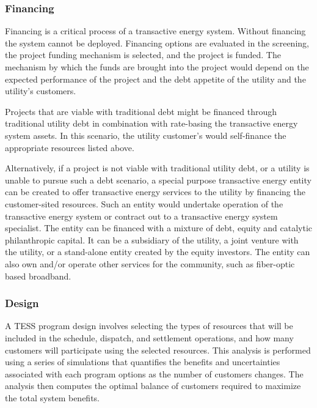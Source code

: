 \documentclass[10pt,twocolumn]{article}
\begin{document}
\subsubsection{Financing}

Financing is a critical process of a transactive energy system. Without financing the system cannot be deployed.  Financing options are evaluated in the screening, the project funding mechanism is selected, and the project is funded.  The mechanism by which the funds are brought into the project would depend on the expected performance of the project and the debt appetite of the utility and the utility's customers.  

Projects that are viable with traditional debt might be financed through traditional utility debt in combination with rate-basing the transactive energy system assets.  In this scenario, the utility customer's would self-finance the appropriate resources listed above.  

Alternatively, if a project is not viable with traditional utility debt, or a utility is unable to pursue such a debt scenario, a special purpose transactive energy entity can be created to offer transactive energy services to the utility by financing the customer-sited resources.  Such an entity would undertake operation of the transactive energy system or contract out to a transactive energy system specialist.  The entity can be financed with a mixture of debt, equity and catalytic philanthropic capital. It can be a subsidiary of the utility, a joint venture with the utility, or a stand-alone entity created by the equity investors. The entity can also own and/or operate other services for the community, such as fiber-optic based broadband.  

\subsubsection{Design}

A TESS program design involves selecting the types of resources that will be included in the schedule, dispatch, and settlement operations, and how many customers will participate using the selected resources. This analysis is performed using a series of simulations that quantifies the benefits and uncertainties associated with each program options as the number of customers changes. The analysis then computes the optimal balance of customers required to maximize the total system benefits.
\end{document}
